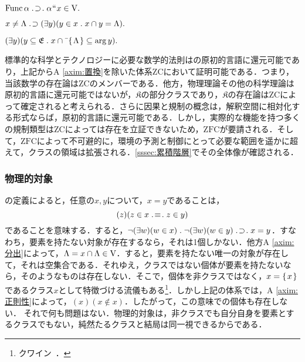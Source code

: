\begin{axim}[置換]
\label{axim:置換}
$
    \func\alpha\case{1}{1}{1}\alpha\img x\in\univ.
$
\end{axim}

\begin{axim}[正則性]
\label{axim:正則性}
$
    x\neq \Lambda {\;.\!}\supset (\exists y)(y\in x{\;.\;}x\cap y=\Lambda).
$
\end{axim}

\begin{axim}[選択]
\label{axim:選択}
$
    (\exists y)(
        y\subseteq\mathfrak{E}\con{1}x\cap\barl{\classab{\Lambda}}\subseteq\arg y
    ).
$
\end{axim}

\noindent 標準的な科学とテクノロジーに必要な数学的法則はの原初的言語に還元可能であり，上記からA \ref{axim:置換}を除いた体系$\mathrm{ZC}$において証明可能である．つまり，当該数学の存在論は$\mathrm{ZC}$のメンバーである．他方，物理理論その他の科学理論は原初的言語に還元可能ではないが，$\mathfrak{K}$の部分クラスであり，$\mathfrak{K}$の存在論は$\mathrm{ZC}$によって確定されると考えられる．さらに因果と規制の概念は，解釈空間に相対化する形式ならば，原初的言語に還元可能である．しかし，実際的な機能を持つ多くの規制類型は$\mathrm{ZC}$によっては存在を立証できないため，$\mathrm{ZFC}$が要請される．そして，$\mathrm{ZFC}$によって不可避的に，環境の予測と制御にとって必要な範囲を遥かに超えて，クラスの領域は拡張される．\ref{sssec:累積階層}でその全体像が確認される．

\subsubsection{物理的対象}
\label{sssec:物理的対象}

の定義によると，任意の$ x,y $について，$ x = y $であることは，
\[
    (z)(z\in x\case{3}{1}{1}z\in y)
\]
であることを意味する．すると，$ \neg(\exists w)(w\in x)\con{1}\neg(\exists w)(w\in y)\case{1}{1}{1}x = y $．すなわち，要素を持たない対象が存在するなら，それは1個しかない．他方A \ref{axim:分出}によって，$ \Lambda = x\cap\Lambda\in\mathrm{V} $．すると，要素を持たない唯一の対象が存在して，それは空集合である．それゆえ，クラスではない個体が要素を持たないなら，そのようなものは存在しない．そこで，個体を非クラスではなく，$ x = \{\mspace{2mu}x\mspace{2mu}\} $であるクラス$ x $として特徴づける流儀もある\footnote{
    クワイン~\cite[p.\,29]{クワインa}．
}．しかし上記の体系では，A \ref{axim:正則性}によって，$ (x)(x\notin x) $．したがって，この意味での個体も存在しない．
それで何も問題はない．物理的対象は，非クラスでも自分自身を要素とするクラスでもない，純然たるクラスと結局は同一視できるからである．

